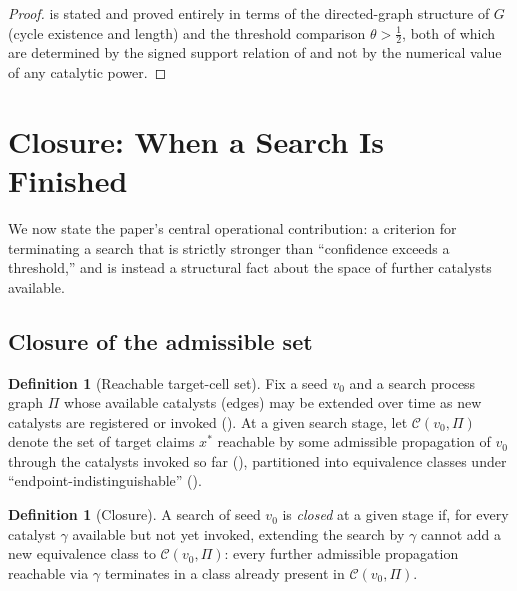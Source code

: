 \documentclass[11pt,twocolumn,a4paper]{article}
\theoremstyle{thmstyle}
\theoremstyle{definition}
\newtheorem{definition}[theorem]{Definition}
\theoremstyle{remark}
\newcommand{\Proc}{\Pi}
\newcommand{\Cell}{\mathcal{C}}
\begin{document}
\begin{proof}
 is stated and proved entirely in terms of the
directed-graph structure of $G$ (cycle existence and length) and the
threshold comparison $\theta>\tfrac12$, both of which are determined by
the signed support relation of  and not by the
numerical value of any catalytic power.
\end{proof}

\section{Closure: When a Search Is Finished}
\label{sec:closure}

We now state the paper's central operational contribution: a criterion for
terminating a search that is strictly stronger than ``confidence exceeds a
threshold,'' and is instead a structural fact about the space of further
catalysts available.

\subsection{Closure of the admissible set}

\begin{definition}[Reachable target-cell set]
\label{def:reachable}
Fix a seed $v_0$ and a search process graph $\Proc$ whose available
catalysts (edges) may be extended over time as new catalysts are
registered or invoked (). At a given search stage,
let $\Cell(v_0,\Proc)$ denote the set of target claims $x^{\ast}$ reachable
by some admissible propagation of $v_0$ through the catalysts invoked so
far (), partitioned into equivalence
classes under ``endpoint-indistinguishable'' ().
\end{definition}

\begin{definition}[Closure]
\label{def:closure}
A search of seed $v_0$ is \emph{closed} at a given stage if, for every
catalyst $\gamma$ available but not yet invoked, extending the search by
$\gamma$ cannot add a new equivalence class to $\Cell(v_0,\Proc)$: every
further admissible propagation reachable via $\gamma$ terminates in a
class already present in $\Cell(v_0,\Proc)$.
\end{definition}
\end{document}

